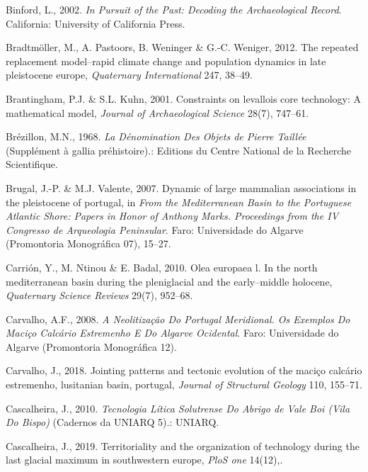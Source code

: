 \documentclass[12pt,twoside]{reedthesis}
\begin{document}
\leavevmode\hypertarget{ref-binford2002}{}%
Binford, L., 2002. \emph{In Pursuit of the Past: Decoding the Archaeological Record}. California: University of California Press.

\leavevmode\hypertarget{ref-bradtmoller2012}{}%
Bradtmöller, M., A. Pastoors, B. Weninger \& G.-C. Weniger, 2012. The repeated replacement model--rapid climate change and population dynamics in late pleistocene europe, \emph{Quaternary International} 247, 38--49.

\leavevmode\hypertarget{ref-brantingham2001}{}%
Brantingham, P.J. \& S.L. Kuhn, 2001. Constraints on levallois core technology: A mathematical model, \emph{Journal of Archaeological Science} 28(7), 747--61.

\leavevmode\hypertarget{ref-brezillon1968}{}%
Brézillon, M.N., 1968. \emph{La Dénomination Des Objets de Pierre Taillée} (Supplément à gallia préhistoire).: Editions du Centre National de la Recherche Scientifique.

\leavevmode\hypertarget{ref-brugal2007}{}%
Brugal, J.-P. \& M.J. Valente, 2007. Dynamic of large mammalian associations in the pleistocene of portugal, in \emph{From the Mediterranean Basin to the Portuguese Atlantic Shore: Papers in Honor of Anthony Marks. Proceedings from the IV Congresso de Arqueologia Peninsular}. Faro: Universidade do Algarve (Promontoria Monográfica 07), 15--27.

\leavevmode\hypertarget{ref-carrion2010}{}%
Carrión, Y., M. Ntinou \& E. Badal, 2010. Olea europaea l. In the north mediterranean basin during the pleniglacial and the early--middle holocene, \emph{Quaternary Science Reviews} 29(7), 952--68.

\leavevmode\hypertarget{ref-carvalho2008}{}%
Carvalho, A.F., 2008. \emph{A Neolitização Do Portugal Meridional. Os Exemplos Do Maciço Calcário Estremenho E Do Algarve Ocidental}. Faro: Universidade do Algarve (Promontoria Monográfica 12).

\leavevmode\hypertarget{ref-carvalho2018}{}%
Carvalho, J., 2018. Jointing patterns and tectonic evolution of the maciço calcário estremenho, lusitanian basin, portugal, \emph{Journal of Structural Geology} 110, 155--71.

\leavevmode\hypertarget{ref-cascalheira2010}{}%
Cascalheira, J., 2010. \emph{Tecnologia Lítica Solutrense Do Abrigo de Vale Boi (Vila Do Bispo)} (Cadernos da UNIARQ 5).: UNIARQ.

\leavevmode\hypertarget{ref-cascalheira2019}{}%
Cascalheira, J., 2019. Territoriality and the organization of technology during the last glacial maximum in southwestern europe, \emph{PloS one} 14(12),.
\end{document}

